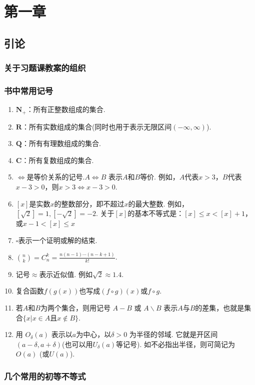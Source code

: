 \chapter{第一章}
\section{引论}
\subsection{关于习题课教案的组织}
\subsection{书中常用记号}
\begin{enumerate}
	\item $ \mathbf{N}_{+} $：所有正整数组成的集合.
	\item $ \mathbf{R} $：所有实数组成的集合(同时也用于表示无限区间$( -\infty,\infty )$).
	\item $ \mathbf{Q} $：所有有理数组成的集合.
	\item $ \mathbf{C} $：所有复数组成的集合.
	\item $ \iff $是等价关系的记号.$ A\iff B $ 表示$ A $和$ B $等价. 例如，$ A $代表$ x > 3 $，$ B $代表$ x-3>0 $，则$ x>3\iff x-3>0 $.
	\item $ [x] $是实数$ x $的整数部分，即不超过$ x $的最大整数. 例如，$ [\sqrt{2}] = 1, [-\sqrt{2}] = -2 $. 关于$ [x] $的基本不等式是：$ [x]\leqslant x < [x] + 1 $，或$ x-1<[x]\leqslant x $
	\item $ \square $表示一个证明或解的结束.
	\item $ {n \choose k} = C_n^k = \frac{n(n-1)\cdots(n-k+1)}{k!}$.
	\item 记号$ \approx $表示近似值. 例如$ \sqrt{2}\approx 1.4 $.
	\item 复合函数$ f(g(x)) $也写成$ (f\circ g)(x) $或$ f \circ g $.
	\item 若$ A $和$ B $为两个集合，则用记号 $ A-B $ 或 $ A \backslash B $ 表示$ A $与$ B $的差集，也就是集合$ \{x|x\in A \text{且} x\notin B\} $.
	\item 用 $ O_\delta (a) $ 表示以$ a $为中心，以$ \delta >0 $ 为半径的邻域. 它就是开区间$ (a-\delta, a+\delta) $(也可以用$ U_\delta (a) $等记号). 如不必指出半径，则可简记为$ O(a)$ (或$ U(a) $).
\end{enumerate}


\subsection{几个常用的初等不等式}
